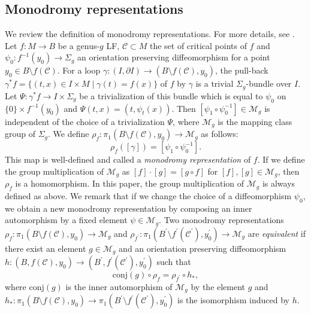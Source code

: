 \documentclass{amsart}
\theoremstyle{plain}
\theoremstyle{definition}
\begin{document}
\subsection{Monodromy representations}\label{monodromy}
We review the definition of monodromy representations.
For more details, see \cite{GS}.
Let $f:M\rightarrow B$ be a genus-$g$ LF, $\mathcal{C}\subset M$ the set of critical points of $f$ and 
$\psi_0:f^{-1}(y_0)\rightarrow \Sigma_g$ an orientation preserving diffeomorphism for a point $y_0\in B\setminus f(\mathcal{C})$. 
For a loop $\gamma:(I,\partial I)\rightarrow (B\setminus f(\mathcal{C}),y_0)$, the pull-back $\gamma^{\ast}f=\{(t,x)\in I\times M\mid \gamma(t)=f(x)\}$ of $f$ by $\gamma$ is a trivial $\Sigma_g$-bundle over $I$.
Let $\Psi:\gamma^{\ast}f\rightarrow I\times \Sigma_g$ be a trivialization of this bundle which is equal to $\psi_0$ on $\{0\}\times f^{-1}(y_0)$ and $\Psi(t,x)=(t,\psi_t(x))$.
Then $[\psi_1\circ \psi_0^{-1}]\in \mathcal{M}_g$ is independent of the choice of a trivialization $\Psi$, where $\mathcal{M}_g$ is the mapping class group of $\Sigma_g$. 
We define $\rho_{f}:\pi_1(B\setminus f(\mathcal{C}),y_0)\rightarrow \mathcal{M}_g$ as follows:
\[
\rho_{f}([\gamma])=[\psi_1\circ \psi_0^{-1}]. 
\]
This map is well-defined and called a {\it monodromy representation} of $f$. 
If we define the group multiplication of $\mathcal{M}_g$ as $[f]\cdot[g]=[g\circ f]$ for $[f],[g]\in \mathcal{M}_g$, then $\rho_{f}$ is a homomorphism. 
In this paper, the group multiplication of $\mathcal{M}_g$ is always defined as above. 
We remark that if we change the choice of a diffeomorphism $\psi_0$, 
we obtain a new monodromy representation by composing an inner automorphism by a fixed element $\psi\in\mathcal{M}_g$. 
Two monodromy representations $\rho_f:\pi_1(B\setminus f(\mathcal{C}),y_0)\rightarrow\mathcal{M}_g$ and $\rho_{f^\prime}:\pi_1(B^\prime\setminus f^\prime(\mathcal{C}^\prime),y_0^\prime)\rightarrow\mathcal{M}_g$ 
are {\it equivalent} if there exist an element $g\in\mathcal{M}_g$ and an orientation preserving diffeomorphism $h:(B,f(\mathcal{C}),y_0)\rightarrow(B^\prime,f^\prime(\mathcal{C}^\prime),y_0^\prime)$ 
such that 
\[
\text{conj}(g)\circ\rho_f=\rho_{f^\prime}\circ h_\ast, 
\]
where $\text{conj}(g)$ is the inner automorphism of $\mathcal{M}_g$ by the element $g$ and 
$h_\ast:\pi_1(B\setminus f(\mathcal{C}),y_0)\rightarrow\pi_1(B^\prime\setminus f^\prime(\mathcal{C}^\prime),y_0^\prime)$ is the isomorphism induced by $h$. 
\par
\end{document}
